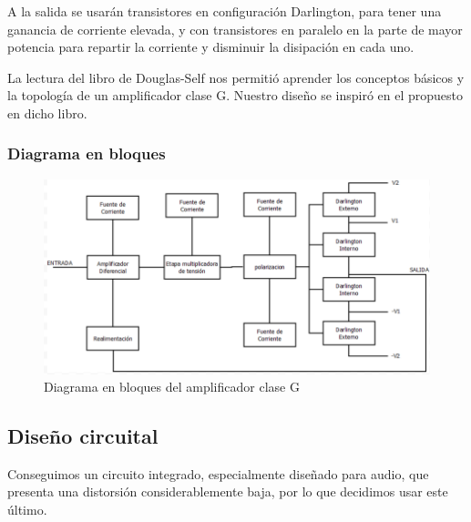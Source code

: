 \documentclass[a4paper,12pt,twoside]{article}
\begin{document}
A la salida se usarán transistores en configuración Darlington, para tener una ganancia de corriente elevada, y con transistores en paralelo en la parte de mayor potencia para repartir la corriente y disminuir la disipación en cada uno.

La lectura del libro de Douglas-Self nos permitió aprender los conceptos básicos y la topología de un amplificador clase G. Nuestro diseño se inspiró en el propuesto en dicho libro.



\subsubsection{Diagrama en bloques}



\begin{figure}[H]
	\centering
	\includegraphics[scale=0.75]{img/ampli_bloques}
	\caption{Diagrama en bloques del amplificador clase G}
	\label{fig:ampli_bloques}
\end{figure}




\subsection{Diseño circuital}

Conseguimos un circuito integrado, especialmente diseñado para audio, que presenta una distorsión considerablemente baja, por lo que decidimos usar este último.


\end{document}
